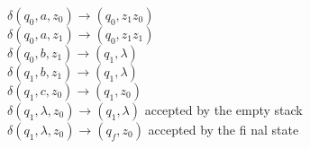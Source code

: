 \documentclass{beamer}
\begin{document}
\begin{frame}
	$\delta$$(q_0,a,z_0)\xrightarrow{}(q_0,z_1z_0)$\\
	$\delta$$(q_0,a,z_1)\xrightarrow{}(q_0,z_1z_1)$\\
	$\delta$$(q_0,b,z_1)\xrightarrow{}(q_1,\lambda)$\\
	$\delta$$(q_1,b,z_1)\xrightarrow{}(q_1,\lambda)$\\
	$\delta$$(q_1,c,z_0)\xrightarrow{}(q_1,z_0)$\\
	$\delta$$(q_1,\lambda,z_0)\xrightarrow{}(q_1,\lambda)$ accepted by the empty stack\\
	$\delta$$(q_1,\lambda,z_0)\xrightarrow{}(q_f,z_0)$ accepted by the fi nal state\\
\end{frame}

	
\end{document}
